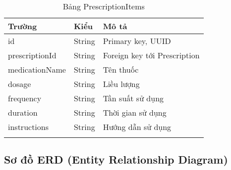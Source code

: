 \documentclass[12pt,a4paper]{report}
\begin{document}
\begin{longtable}{|p{3cm}|p{2cm}|p{8cm}|}
\hline
\textbf{Trường} & \textbf{Kiểu} & \textbf{Mô tả} \\
\hline
id & String & Primary key, UUID \\
\hline
prescriptionId & String & Foreign key tới Prescription \\
\hline
medicationName & String & Tên thuốc \\
\hline
dosage & String & Liều lượng \\
\hline
frequency & String & Tần suất sử dụng \\
\hline
duration & String & Thời gian sử dụng \\
\hline
instructions & String & Hướng dẫn sử dụng \\
\hline
\caption{Bảng PrescriptionItems}
\end{longtable}

\subsection{Sơ đồ ERD (Entity Relationship Diagram)}
\end{document}
